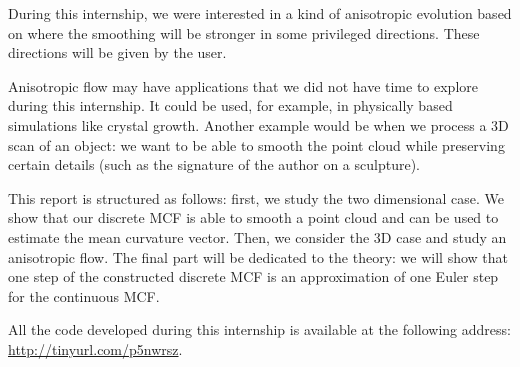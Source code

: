 During this internship, we were interested in a kind of anisotropic evolution
based on \cite{chambolle2012nonlocal} where the smoothing will be stronger in
some privileged directions. These directions will be given by the user.

Anisotropic flow may have applications that we did not have time to explore
during this internship. It could be used, for example, in physically based
simulations like crystal growth. Another example would be when we
process a 3D scan of an object: we want to be able to smooth the point cloud
while preserving certain details (such as the signature of the author on a
sculpture).

This report is structured as follows: first, we study the two dimensional case.
We show that our discrete MCF is able to smooth a point cloud and can be used to
estimate the mean curvature vector. Then, we consider the 3D case and study an
anisotropic flow. The final part will be dedicated to the theory: we will show
that one step of the constructed discrete MCF is an approximation of one Euler
step for the continuous MCF.

All the code developed during this internship is available at the following
address: \url{http://tinyurl.com/p5nwrsz}.


